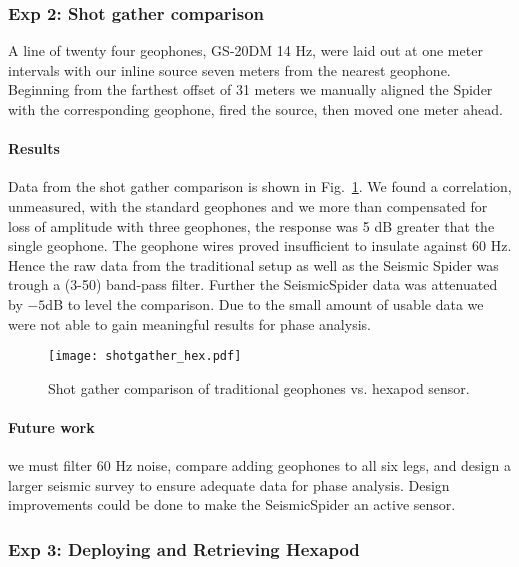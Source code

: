 \subsubsection{Exp 2: Shot gather comparison}

A line of twenty four geophones, GS-20DM 14 Hz, were laid out at one meter intervals with our inline source seven meters from the nearest geophone. Beginning from the farthest offset of 31 meters we manually aligned the Spider with the corresponding geophone, fired the source, then moved one meter ahead. 

\paragraph{Results}
Data from the shot gather comparison is shown in Fig.~\ref{fig:shotgatherHexpod}.
We found a correlation, unmeasured, with the standard geophones and we more than compensated for loss of amplitude with three geophones, the response was 5 dB greater that the single geophone. The geophone wires proved insufficient to insulate against 60 Hz. Hence the raw data from the traditional setup as well as the Seismic Spider was trough a (3-50) band-pass filter. Further the SeismicSpider data was attenuated by $-5$dB to level the comparison.  Due to the small amount of usable data we were not able to gain meaningful results for phase analysis.   

\begin{figure} \centering
  {\texttt{[image: shotgather\_hex.pdf]}}
 \caption{Shot gather comparison of traditional geophones vs. hexapod sensor. 
 \label{fig:shotgatherHexpod}}
\end{figure}


\paragraph{Future work}	we must filter 60 Hz noise, compare adding geophones to all six legs, and design a larger seismic survey to ensure adequate data for phase analysis. Design improvements could be done to make the SeismicSpider an active sensor.   

\subsubsection{Exp 3: Deploying and Retrieving Hexapod}
